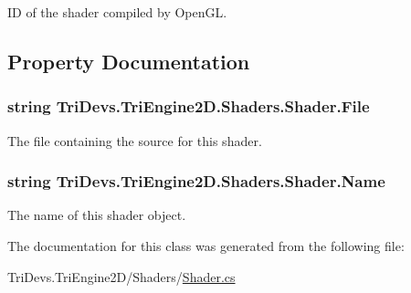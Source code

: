 I\-D of the shader compiled by Open\-G\-L. 



\subsection{Property Documentation}
\hypertarget{class_tri_devs_1_1_tri_engine2_d_1_1_shaders_1_1_shader_a3693f989f82ee30752125e115f321392}{
\subsubsection[{File}]{\setlength{\rightskip}{0pt plus 5cm}string Tri\-Devs.\-Tri\-Engine2\-D.\-Shaders.\-Shader.\-File\hspace{0.3cm}{\ttfamily [get]}}}\label{class_tri_devs_1_1_tri_engine2_d_1_1_shaders_1_1_shader_a3693f989f82ee30752125e115f321392}


The file containing the source for this shader. 

\hypertarget{class_tri_devs_1_1_tri_engine2_d_1_1_shaders_1_1_shader_a5a74adb8cf28279cffb9ba636369c933}{
\subsubsection[{Name}]{\setlength{\rightskip}{0pt plus 5cm}string Tri\-Devs.\-Tri\-Engine2\-D.\-Shaders.\-Shader.\-Name\hspace{0.3cm}{\ttfamily [get]}}}\label{class_tri_devs_1_1_tri_engine2_d_1_1_shaders_1_1_shader_a5a74adb8cf28279cffb9ba636369c933}


The name of this shader object. 



The documentation for this class was generated from the following file\-:\begin{DoxyCompactItemize}
\item 
Tri\-Devs.\-Tri\-Engine2\-D/\-Shaders/\hyperlink{_shader_8cs}{Shader.\-cs}\end{DoxyCompactItemize}
